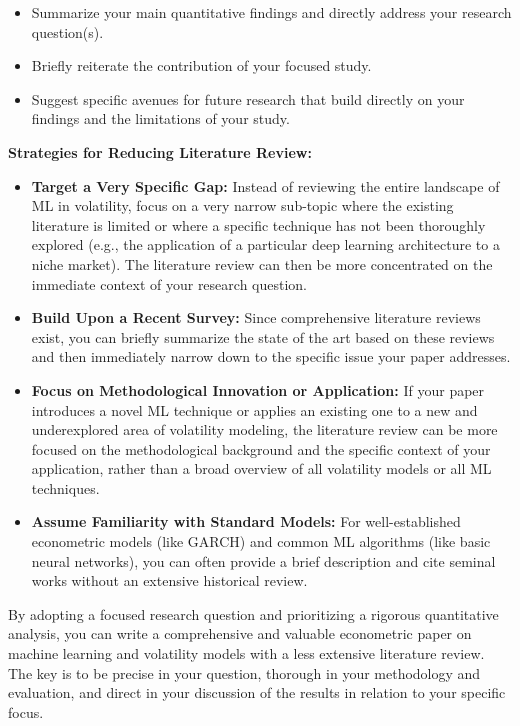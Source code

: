 \documentclass[11pt,preprint]{elsarticle}
\numberwithin{equation}{section}
\numberwithin{figure}{section}
\numberwithin{table}{section}
\def\tightlist{} %
\begin{document}
\begin{itemize}
\tightlist
\item
  Summarize your main quantitative findings and directly address your
  research question(s).
\item
  Briefly reiterate the contribution of your focused study.
\item
  Suggest specific avenues for future research that build directly on
  your findings and the limitations of your study.
\end{itemize}

\textbf{Strategies for Reducing Literature Review:}

\begin{itemize}
\tightlist
\item
  \textbf{Target a Very Specific Gap:} Instead of reviewing the entire
  landscape of ML in volatility, focus on a very narrow sub-topic where
  the existing literature is limited or where a specific technique has
  not been thoroughly explored (e.g., the application of a particular
  deep learning architecture to a niche market). The literature review
  can then be more concentrated on the immediate context of your
  research question.
\item
  \textbf{Build Upon a Recent Survey:} Since comprehensive literature
  reviews exist, you can briefly summarize the state of the art based on
  these reviews and then immediately narrow down to the specific issue
  your paper addresses.
\item
  \textbf{Focus on Methodological Innovation or Application:} If your
  paper introduces a novel ML technique or applies an existing one to a
  new and underexplored area of volatility modeling, the literature
  review can be more focused on the methodological background and the
  specific context of your application, rather than a broad overview of
  all volatility models or all ML techniques.
\item
  \textbf{Assume Familiarity with Standard Models:} For well-established
  econometric models (like GARCH) and common ML algorithms (like basic
  neural networks), you can often provide a brief description and cite
  seminal works without an extensive historical review.
\end{itemize}

By adopting a focused research question and prioritizing a rigorous
quantitative analysis, you can write a comprehensive and valuable
econometric paper on machine learning and volatility models with a less
extensive literature review. The key is to be precise in your question,
thorough in your methodology and evaluation, and direct in your
discussion of the results in relation to your specific focus.
\end{document}

